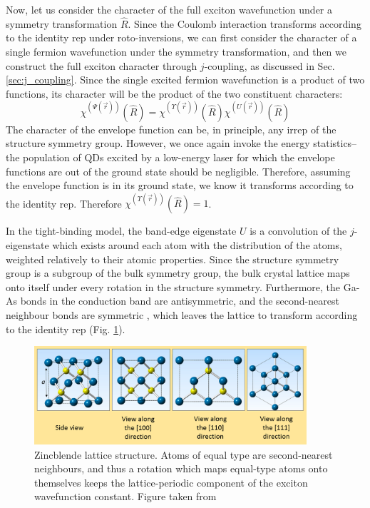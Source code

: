 Now, let us consider the character of the full exciton wavefunction under a symmetry transformation $\hat{R}$. Since the Coulomb interaction transforms according to the identity rep under roto-inversions, we can first consider the character of a single fermion wavefunction under the symmetry transformation, and then we construct the full exciton character through $j$-coupling, as discussed in Sec. \ref{sec:j_coupling}. Since the single excited fermion wavefunction is a product of two functions, its character will be the product of the two constituent characters:
\begin{equation} \label{eq:character_breakdown}
\chi^{\left(\Psi\left(\vec{r}\right)\right)}\left(\hat{R}\right)=\chi^{\left(\Upsilon\left(\vec{r}\right)\right)}\left(\hat{R}\right)\chi^{\left(U\left(\vec{r}\right)\right)}\left(\hat{R}\right)
\end{equation}
The character of the envelope function can be, in principle, any irrep of the structure symmetry group. However, we once again invoke the energy statistics--the population of QDs excited by a low-energy laser for which the envelope functions are out of the ground state should be negligible. Therefore, assuming the envelope function is in its ground state, we know it transforms according to the identity rep. Therefore $\chi^{\left(\Upsilon\left(\vec{r}\right)\right)}\left(\hat{R}\right)=1$.

In the tight-binding model, the band-edge eigenstate $U$ is a convolution of the $j$-eigenstate which exists around each atom with the distribution of the atoms, weighted relatively to their atomic properties. Since the structure symmetry group is a subgroup of the bulk symmetry group, the bulk crystal lattice maps onto itself under every rotation in the structure symmetry. Furthermore, the Ga-As bonds in the conduction band are antisymmetric, and the second-nearest neighbour bonds are symmetric \cite{gaas_bonding}, which leaves the lattice to transform according to the identity rep (Fig. \ref{fig:zincblende_lattice_structure}).

\begin{figure}
\begin{center}
\includegraphics[width=0.9\textwidth]{figures/zincblende_lattice_structure}
\caption{Zincblende lattice structure. Atoms of equal type are second-nearest neighbours, and thus a rotation which maps equal-type atoms onto themselves keeps the lattice-periodic component of the exciton wavefunction constant. Figure taken from \cite[Fig. 2.3]{zincblende_lattice_structure} \label{fig:zincblende_lattice_structure}}
\end{center}
\end{figure}

